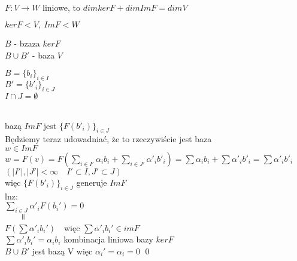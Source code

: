 \begin{tw}[o indeksie]
    ~\\
    $F: V \rightarrow W $ liniowe, to $dimker F + dimIm F = dim V$
\end{tw}
\begin{dd}
    $ker F < V,\  Im F < W$ \\
    \begin{minipage}[c]{0.5\textwidth}
        $B$ - bzaza $ker F$ \\
        $ B \cup B' $ - baza $V$
    \end{minipage}%
    \begin{minipage}[c]{0.5\textwidth}
        $B = \{b_i\}_{i \in I}$ \\
        $B' = \{b'_i\}_{i \in J}$ \\
        $I \cap J = \emptyset $
    \end{minipage} \\
    bazą $Im F$ jest $\{F(b'_i)\}_{i \in J}$ \\
    Będziemy teraz udowadniać, że to rzeczywiście jest baza\\
    $w \in Im F$ \\
    $w = F(v) = F(\sum\limits_{i \in I'} \alpha_i b_i + \sum\limits_{i \in J'} \alpha'_i b'_i) = \sum\alpha_i b_i + \sum\alpha'_i b'_i = \sum\alpha'_i b'_i $\\
    $(|I'|, |J'|<\infty \quad I'\subset I, J'\subset J)$\\
    więc $\{F(b'_i)\}_{i \in J} $ generuje $ImF$ \\
    lnz: \\
    $\sum\limits_{i\in J} \alpha'_i F(b_i') = 0$\\
    $\qquad \rotatebox{90}{$\,=$}$\\
    $F(\sum \alpha'_i b_i') \quad $więc $ \sum \alpha'_i b_i' \in imF$\\
    $\sum \alpha'_i b_i' =\alpha_i b_i$ \quad kombinacja liniowa bazy $kerF$\\
    $B\cup B'$ jest bazą V więc $\alpha_i' = \alpha_i = 0$ \quad \qed
\end{dd} 

